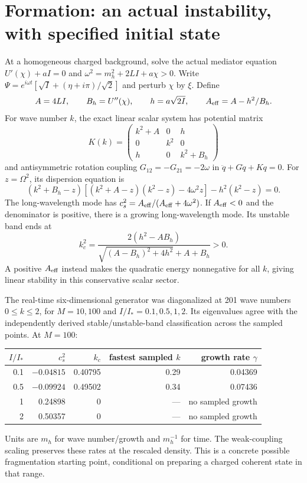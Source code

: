 \documentclass[11pt]{article}
\begin{document}
\section{Formation: an actual instability, with specified initial state}
At a homogeneous charged background, solve the actual mediator equation
$U'(\chi)+aI=0$ and
$\omega^2=m_h^2+2LI+a\chi>0$. Write
$\Psi=e^{i\omega t}[\sqrt I+(\eta+i\pi)/\sqrt2]$ and perturb $\chi$
by $\xi$. Define
\begin{equation}
 A=4LI,\qquad B_h=U''(\chi),\qquad h=a\sqrt{2I},\qquad
 A_{\rm eff}=A-h^2/B_h.
\end{equation}
For wave number $k$, the exact linear scalar system has potential matrix
\begin{equation}
 K(k)=\begin{pmatrix}k^2+A&0&h\\0&k^2&0\\h&0&k^2+B_h\end{pmatrix}
\end{equation}
and antisymmetric rotation coupling $G_{12}=-G_{21}=-2\omega$ in
$\ddot q+G\dot q+Kq=0$. For $z=\Omega^2$, its dispersion equation is
\begin{equation}
 (k^2+B_h-z)[(k^2+A-z)(k^2-z)-4\omega^2 z]
 -h^2(k^2-z)=0.
 \label{qfg:dispersion}
\end{equation}
The long-wavelength mode has
$c_s^2=A_{\rm eff}/(A_{\rm eff}+4\omega^2)$.
If $A_{\rm eff}<0$ and the denominator is positive, there is a growing
long-wavelength mode. Its unstable band ends at
\begin{equation}
 k_c^2=\frac{2(h^2-AB_h)}
 {\sqrt{(A-B_h)^2+4h^2}+A+B_h}>0.
\end{equation}
A positive $A_{\rm eff}$ instead makes the quadratic energy nonnegative
for all $k$, giving linear stability in this conservative scalar sector.

The real-time six-dimensional generator was diagonalized at 201 wave
numbers $0\le k\le2$, for $M=10,100$ and $I/I_*=0.1,0.5,1,2$.
Its eigenvalues agree with the independently derived stable/unstable-band
classification across the sampled points. At $M=100$:
\begin{center}
\begin{tabular}{rrrrr}
\toprule
$I/I_*$ & $c_s^2$ & $k_c$ & fastest sampled $k$ & growth rate $\gamma$\\
\midrule
0.1 & $-0.04815$ & 0.40795 & 0.29 & 0.04369\\
0.5 & $-0.09924$ & 0.49502 & 0.34 & 0.07436\\
1 & 0.24898 & 0 & --- & no sampled growth\\
2 & 0.50357 & 0 & --- & no sampled growth\\
\bottomrule
\end{tabular}
\end{center}
Units are $m_h$ for wave number/growth and $m_h^{-1}$ for time.
The weak-coupling scaling preserves these rates at the rescaled density.
This is a concrete possible fragmentation starting point, conditional on
preparing a charged coherent state in that range.
\end{document}
